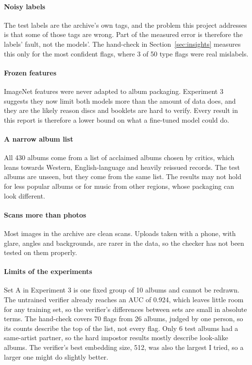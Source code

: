 \documentclass[conference]{IEEEtran}
\begin{document}
\paragraph{Noisy labels} The test labels are the archive's own tags, and the problem this project addresses is that some of those tags are wrong. Part of the measured error is therefore the labels' fault, not the models'. The hand-check in Section~\ref{sec:insights} measures this only for the most confident flags, where 3 of 50 type flags were real mislabels.

\paragraph{Frozen features} ImageNet features were never adapted to album packaging. Experiment 3 suggests they now limit both models more than the amount of data does, and they are the likely reason discs and booklets are hard to verify. Every result in this report is therefore a lower bound on what a fine-tuned model could do.

\paragraph{A narrow album list} All 430 albums come from a list of acclaimed albums chosen by critics, which leans towards Western, English-language and heavily reissued records. The test albums are unseen, but they come from the same list. The results may not hold for less popular albums or for music from other regions, whose packaging can look different.

\paragraph{Scans more than photos} Most images in the archive are clean scans. Uploads taken with a phone, with glare, angles and backgrounds, are rarer in the data, so the checker has not been tested on them properly.

\paragraph{Limits of the experiments} Set A in Experiment 3 is one fixed group of 10 albums and cannot be redrawn. The untrained verifier already reaches an AUC of 0.924, which leaves little room for any training set, so the verifier's differences between sets are small in absolute terms. The hand-check covers 70 flags from 26 albums, judged by one person, so its counts describe the top of the list, not every flag. Only 6 test albums had a same-artist partner, so the hard impostor results mostly describe look-alike albums. The verifier's best embedding size, 512, was also the largest I tried, so a larger one might do slightly better.
\end{document}
